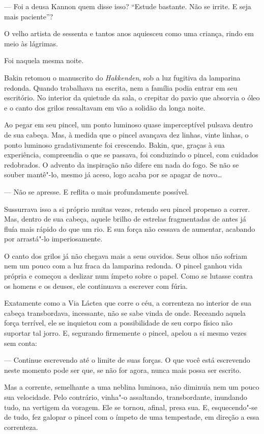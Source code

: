 --- Foi a deusa Kannon quem disse isso? ``Estude bastante. Não se irrite. E
seja mais paciente''?

O velho artista de sessenta e tantos anos aquiesceu como uma criança,
rindo em meio às lágrimas.

\sectionitem
Foi naquela mesma noite.

Bakin retomou o manuscrito do \textit{Hakkenden}, sob a luz fugitiva da
lamparina redonda. Quando trabalhava na escrita, nem a família podia
entrar em seu escritório. No interior da quietude da sala, o crepitar
do pavio que absorvia o óleo e o canto dos grilos ressaltavam em vão a
solidão da longa noite.

Ao pegar em seu pincel, um ponto luminoso quase imperceptível pulsava
dentro de sua cabeça. Mas, à medida que o pincel avançava dez linhas,
vinte linhas, o ponto luminoso gradativamente foi crescendo. Bakin,
que, graças à sua experiência, compreendia o que se passava, foi
conduzindo o pincel, com cuidados redobrados. O advento da inspiração
não difere em nada do fogo. Se não se souber mantê"-lo, mesmo já aceso,
logo acaba por se apagar de novo\ldots{}

--- Não se apresse. E reflita o mais profundamente possível.

Sussurrava isso a si próprio muitas vezes, retendo seu pincel propenso a
correr. Mas, dentro de sua cabeça, aquele brilho de estrelas
fragmentadas de antes já fluía mais rápido do que um rio. E sua força
não cessava de aumentar, acabando por arrastá"-lo imperiosamente.

O canto dos grilos já não chegava mais a seus ouvidos. Seus olhos não
sofriam nem um pouco com a luz fraca da lamparina redonda. O pincel
ganhou vida própria e começou a deslizar num ímpeto sobre o papel. Como
se lutasse contra os homens e os deuses, ele continuava a escrever com
fúria.

Exatamente como a Via Láctea que corre o céu, a correnteza no interior
de sua cabeça transbordava, incessante, não se sabe vinda de onde.
Receando aquela força terrível, ele se inquietou com a possibilidade de
seu corpo físico não suportar tal jorro. E, segurando firmemente o
pincel, apelou a si mesmo vezes sem conta:

--- Continue escrevendo até o limite de suas forças. O que você está
escrevendo neste momento pode ser que, se não for agora, nunca mais
possa ser escrito.

Mas a corrente, semelhante a uma neblina luminosa, não diminuía nem um
pouco sua velocidade. Pelo contrário, vinha"-o assaltando,
transbordante, inundando tudo, na vertigem da voragem. Ele se tornou,
afinal, presa sua. E, esquecendo"-se de tudo, fez galopar o pincel com o
ímpeto de uma tempestade, em direção a essa correnteza.


